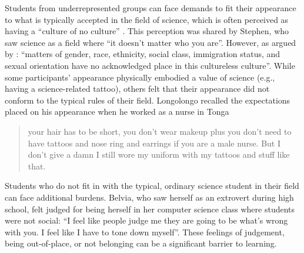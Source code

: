 Students from underrepresented groups can face demands to fit their appearance to what is typically accepted in the field of science, which is often perceived as having a ``culture of no culture'' \citep{traweek2009beamtimes}. This perception was shared by Stephen, who saw science as a field where ``it doesn't matter who you are''. However, as argued by \cite{ong2005body}: ``matters of gender, race, ethnicity, social class, immigration status, and sexual orientation have no acknowledged place in this cultureless culture''. While some participants' appearance physically embodied a value of science (e.g., having a science-related tattoo), others felt that their appearance did not conform to the typical rules of their field. Longolongo recalled the expectations placed on his appearance when he worked as a nurse in Tonga \blockquote{your hair has to be short, you don't wear makeup plus you don't need to have tattoos and nose ring and earrings if you are a male nurse. But I don’t give a damn I still wore my uniform with my tattoos and stuff like that.} Students who do not fit in with the typical, ordinary science student in their field can face additional burdens. Belvia, who saw herself as an extrovert during high school, felt judged for being herself in her computer science class where students were not social: ``I feel like people judge me they are going to be what’s wrong with you. I feel like I have to tone down myself''. These feelings of judgement, being out-of-place, or not belonging can be a significant barrier to learning. 

